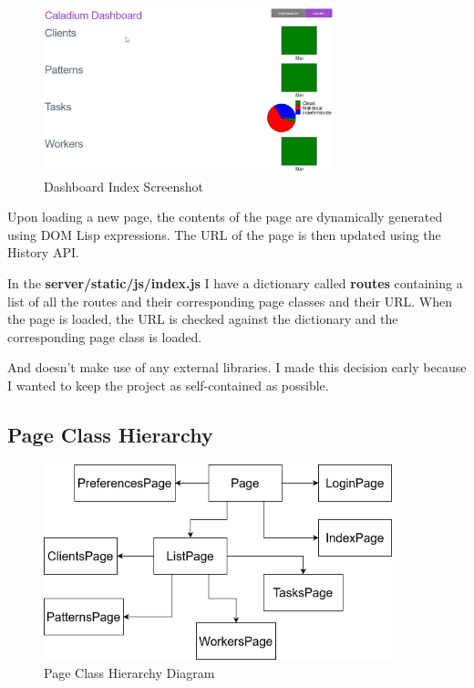 \begin{figure}[h!]
    \centering
    \includegraphics[width=0.75\textwidth]{../docs/dashboard.png}
    \caption{Dashboard Index Screenshot}
    \label{image:dashboardScreenshot}
\end{figure}

Upon loading a new page, the contents of the page are
dynamically generated using DOM Lisp expressions.
The URL of the page is then updated using the History API.

In the \textbf{server/static/js/index.js} I have a dictionary called
\textbf{routes} containing a list of all the routes and their corresponding
page classes and their URL.
When the page is loaded, the URL is checked against the dictionary
and the corresponding page class is loaded.

And doesn't make use of any external libraries.
I made this decision early because I wanted to keep the
project as self-contained as possible.

\subsection {Page Class Hierarchy}

\begin{figure}[h!]
    \includegraphics[width=0.9\textwidth]{images/diagrams/dashboard_hierarchy.drawio}
    \caption{Page Class Hierarchy Diagram}
    \label{image:sysArchitecture}
\end{figure}


